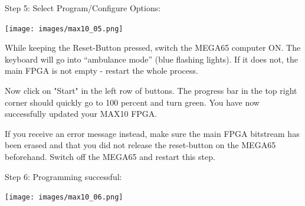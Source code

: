 \vspace{5mm}

\begin{minipage}{\linewidth}
Step 5: Select Program/Configure Options:
  \begin{center}
  \texttt{[image: images/max10\_05.png]}
  \end{center}
\end{minipage}

While keeping the Reset-Button pressed, switch the MEGA65 computer ON.
The keyboard will go into ``ambulance mode'' (blue flashing lights).
If it does not, the main FPGA is not empty - restart the whole process.

Now click on "Start" in the left row of buttons. The progress bar in
the top right corner should quickly go to 100 percent and turn green.
You have now successfully updated your MAX10 FPGA.

If you receive an error message instead, make sure the main FPGA
bitstream has been erased and that you did not release the reset-button on
the MEGA65 beforehand. Switch off the MEGA65 and restart this step.

\begin{minipage}{\linewidth}
Step 6: Programming successful:
  \begin{center}
  \texttt{[image: images/max10\_06.png]}
  \end{center}
\end{minipage}

